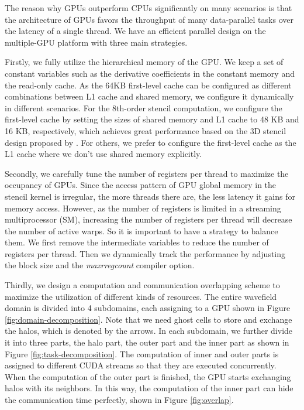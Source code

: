 \documentclass{paris17}
\begin{document}
The reason why GPUs outperform CPUs significantly on many scenarios is that the architecture of GPUs favors the throughput of many data-parallel tasks over the latency of a single thread. We have an efficient parallel design on the multiple-GPU platform with three main strategies.

Firstly, we fully utilize the hierarchical memory of the GPU. We keep a set of constant variables such as the derivative coefficients in the constant memory and the read-only cache. As the 64KB first-level cache can be configured as different combinations between L1 cache and shared memory, we configure it dynamically in different scenarios. For the 8th-order stencil computation, we configure the first-level cache by setting the sizes of shared memory and L1 cache to 48 KB and 16 KB, respectively, which achieves great performance based on the 3D stencil design proposed by \cite{micikevicius20093d}. For others, we prefer to configure the first-level cache as the L1 cache where we don't use shared memory explicitly.

Secondly, we carefully tune the number of registers per thread to maximize the occupancy of GPUs. Since the access pattern of GPU global memory in the stencil kernel is irregular, the more threads there are, the less latency it gains for memory access. However, as the number of registers is limited in a streaming multiprocessor (SM), increasing the number of registers per thread will decrease the number of active warps. So it is important to have a strategy to balance them. We first remove the intermediate variables to reduce the number of registers per thread. Then we dynamically track the performance by adjusting the block size and the \emph{maxrregcount} compiler option.

Thirdly, we design a computation and communication overlapping scheme to maximize the utilization of different kinds of resources. The entire wavefield domain is divided into 4 subdomains, each assigning to a GPU shown in Figure \ref{fig:domain-decomposition}. Note that we need ghost cells to store and exchange the halos, which is denoted by the arrows. In each subdomain, we further divide it into three parts, the halo part, the outer part and the inner part as shown in Figure \ref{fig:task-decomposition}. The computation of inner and outer parts is assigned to different CUDA streams so that they are executed concurrently. When the computation of the outer part is finished, the GPU starts exchanging halos with its neighbors. In this way, the computation of the inner part can hide the communication time perfectly, shown in Figure \ref{fig:overlap}.
\end{document}
